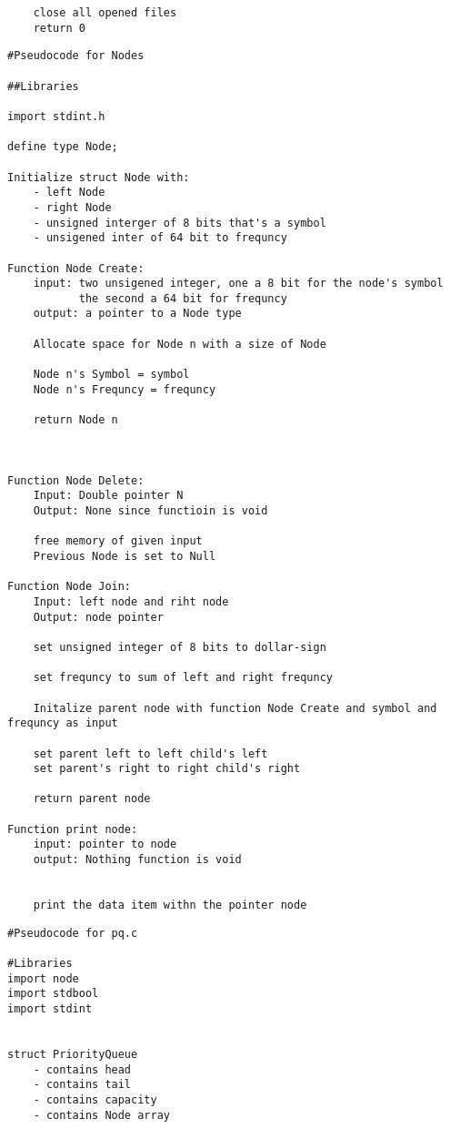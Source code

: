 \documentclass[11pt]{article} %
\begin{document}
\begin{flushleft}
\begin{lstlisting}
    close all opened files
    return 0
\end{lstlisting}


\begin{lstlisting}
#Pseudocode for Nodes

##Libraries

import stdint.h

define type Node;

Initialize struct Node with:
    - left Node
    - right Node
    - unsigned interger of 8 bits that's a symbol
    - unsigened inter of 64 bit to frequncy

Function Node Create:
    input: two unsigened integer, one a 8 bit for the node's symbol
           the second a 64 bit for frequncy
    output: a pointer to a Node type
    
    Allocate space for Node n with a size of Node 

    Node n's Symbol = symbol
    Node n's Frequncy = frequncy

    return Node n



Function Node Delete:
    Input: Double pointer N
    Output: None since functioin is void

    free memory of given input
    Previous Node is set to Null

Function Node Join:
    Input: left node and riht node
    Output: node pointer

    set unsigned integer of 8 bits to dollar-sign

    set frequncy to sum of left and right frequncy

    Initalize parent node with function Node Create and symbol and frequncy as input

    set parent left to left child's left
    set parent's right to right child's right

    return parent node

Function print node:
    input: pointer to node
    output: Nothing function is void

    
    print the data item withn the pointer node
\end{lstlisting}


\begin{lstlisting}
#Pseudocode for pq.c

#Libraries 
import node
import stdbool
import stdint


struct PriorityQueue
    - contains head
    - contains tail
    - contains capacity
    - contains Node array


\end{lstlisting}
\end{flushleft}
\end{document}
